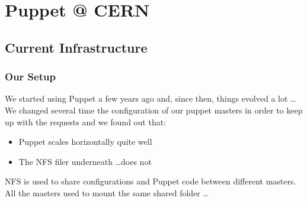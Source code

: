 \documentclass[aspectratio=169]{beamer}
\begin{document}
\section{Puppet @ CERN}

\subsection{Current Infrastructure}
\begin{frame}
    \frametitle{Our Setup}
    We started using Puppet a few years ago and, since then,
    things evolved a lot \ldots \\
    \vspace{1em}
    We changed several time the configuration of our puppet masters in order
    to keep up with the requests and we found out that:

    \begin{itemize}
        \item Puppet scales horizontally quite well
        \item The NFS filer underneath \ldots does not
    \end{itemize}
    \vspace{1em}
    NFS is used to share configurations and Puppet code between
    different masters. \\
    All the masters used to mount the same shared folder \ldots
\end{frame}

\end{document}
